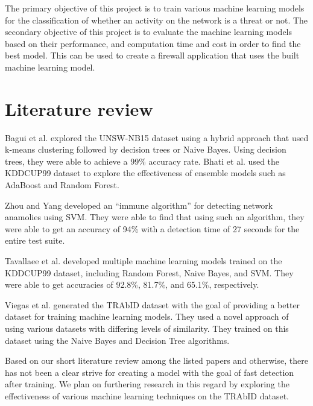 \documentclass[journal]{IEEEtran}
\begin{document}
The primary objective of this project is to train various machine learning models for the classification of whether an activity on the network is a threat or not. The secondary objective of this project is to evaluate the machine learning models based on their performance, and computation time and cost in order to find the best model. This can be used to create a firewall application that uses the built machine learning model.

\section{Literature review}
Bagui et al. explored the UNSW-NB15 dataset using a hybrid approach that used k-means clustering followed by decision trees or Naive Bayes. Using decision trees, they were able to achieve a 99\% accuracy rate. \cite{bagui2019using} Bhati et al. used the KDDCUP99 dataset to explore the effectiveness of ensemble models such as AdaBoost and Random Forest. \cite{bhati2022ensemble} 

Zhou and Yang  developed an ``immune algorithm'' for detecting network anamolies using SVM. They were able to find that using such an algorithm, they were able to get an accuracy of 94\% with a detection time of 27 seconds for the entire test suite. \cite{zhou2006using}

Tavallaee et al. developed multiple machine learning models trained on the KDDCUP99 dataset, including Random Forest, Naive Bayes, and SVM. They were able to get accuracies of 92.8\%, 81.7\%, and 65.1\%, respectively. \cite{tavallaee2009detailed}

Viegas et al. generated the TRAbID dataset with the goal of providing a better dataset for training machine learning models. They used a novel approach of using various datasets with differing levels of similarity. They trained on this dataset using the Naive Bayes and Decision Tree algorithms. \cite{viegas2017toward}

Based on our short literature review among the listed papers and otherwise, there has not been a clear strive for creating a model with the goal of fast detection after training. We plan on furthering research in this regard by exploring the effectiveness of various machine learning techniques on the TRAbID dataset.
\end{document}
